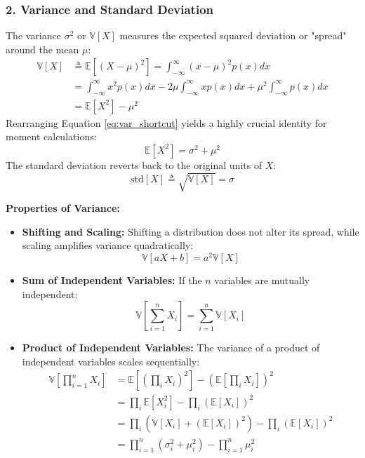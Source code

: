 \documentclass{article}
\begin{document}
\subsubsection*{2. Variance and Standard Deviation}
The variance $\sigma^2$ or $\mathbb{V}[X]$ measures the expected squared deviation or "spread" around the mean $\mu$:
\begin{align}
    \mathbb{V}[X] &\triangleq \mathbb{E}\left[(X - \mu)^2\right] = \int_{-\infty}^{\infty} (x - \mu)^2 p(x) dx \\
    &= \int_{-\infty}^{\infty} x^2 p(x)dx - 2\mu\int_{-\infty}^{\infty} xp(x)dx + \mu^2\int_{-\infty}^{\infty} p(x)dx \\
    &= \mathbb{E}[X^2] - \mu^2 \label{eq:var_shortcut}
\end{align}
Rearranging Equation \ref{eq:var_shortcut} yields a highly crucial identity for moment calculations:
\begin{equation}
    \mathbb{E}[X^2] = \sigma^2 + \mu^2
\end{equation}
The standard deviation reverts back to the original units of $X$:
\begin{equation}
    \text{std}[X] \triangleq \sqrt{\mathbb{V}[X]} = \sigma
\end{equation}

\noindent \textbf{Properties of Variance:}
\begin{itemize}
    \item \textbf{Shifting and Scaling:} Shifting a distribution does not alter its spread, while scaling amplifies variance quadratically:
    \begin{equation}
        \mathbb{V}[aX + b] = a^2\mathbb{V}[X]
    \end{equation}
    \item \textbf{Sum of Independent Variables:} If the $n$ variables are mutually independent:
    \begin{equation}
        \mathbb{V}\left[\sum_{i=1}^{n} X_i\right] = \sum_{i=1}^{n} \mathbb{V}[X_i]
    \end{equation}
    \item \textbf{Product of Independent Variables:} The variance of a product of independent variables scales sequentially:
    \begin{align}
        \mathbb{V}\left[\prod_{i=1}^{n} X_i\right] &= \mathbb{E}\left[\left(\prod_{i} X_i\right)^2\right] - \left(\mathbb{E}\left[\prod_{i} X_i\right]\right)^2 \\
        &= \prod_{i} \mathbb{E}[X_i^2] - \prod_{i} (\mathbb{E}[X_i])^2 \\
        &= \prod_{i} (\mathbb{V}[X_i] + (\mathbb{E}[X_i])^2) - \prod_{i} (\mathbb{E}[X_i])^2 \\
        &= \prod_{i=1}^{n} (\sigma_i^2 + \mu_i^2) - \prod_{i=1}^{n} \mu_i^2
    \end{align}
\end{itemize}
\end{document}
